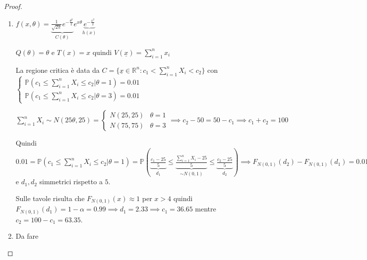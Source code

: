 \documentclass[hidelinks, 10pt]{report}
\begin{document}
\begin{proof}
\noindent
\begin{enumerate}
\item $ f(x, \theta) = \underbrace{\frac{1}{\sqrt{2\pi}} e^{- \frac{\theta^{2}}{2}}}_{C(\theta)} e^{x \theta} \underbrace{e^{-\frac{x^{2}}{2}}}_{h(x)} $

$ Q(\theta) = \theta $ e $ T(x) = x $ quindi $ V(\underline{x}) = \sum\limits_{i = 1}^{n} x_{i} $

La regione critica \`e data da $ C = \{ \underline{x} \in \mathbb{R}^{n} : c_{1} < \sum\limits_{i = 1}^{n} X_{i} < c_{2} \} $ con $ \begin{cases} 
\mathbb{P} (c_{1} \le \sum\limits_{i = 1}^{n} X_{i} \le c_{2} \vert \theta = 1) = 0.01 \\
\mathbb{P} (c_{1} \le \sum\limits_{i = 1}^{n} X_{i} \le c_{2} \vert \theta = 3) = 0.01
\end{cases} $

$ \sum\limits_{i = 1}^{n} X_{i} \sim N(25 \theta, 25) = \begin{cases}
N(25, 25) & \theta = 1 \\
N(75, 75) & \theta = 3
\end{cases} \implies c_{2} - 50 = 50 - c_{1} \implies c_{1} + c_{2} = 100 $ 

Quindi $ 0.01 = \mathbb{P} (c_{1} \le \sum\limits_{i = 1}^{n} X_{i} \le c_{2} \vert \theta = 1) = \mathbb{P} \left( \underbrace{\frac{c_{1} - 25}{5}}_{d_{1}} \le \underbrace{\frac{\sum\limits_{i = 1}^{n} X_{i} - 25}{5}}_{\sim N(0,1)} \le \underbrace{\frac{c_{2} - 25}{5}}_{d_{2}} \right) \implies F_{N(0,1)} (d_{2}) - F_{N(0,1)} (d_{1}) = 0.01 $ e $ d_{1}, d_{2} $ simmetrici rispetto a $ 5 $.

Sulle tavole risulta che $ F_{N(0,1)} (x) \approx 1 $ per $ x > 4 $ quindi $ F_{N(0,1)} (d_{1}) = 1 - \alpha = 0.99 \implies d_{1} = 2.33 \implies c_{1} = 36.65 $ mentre $ c_{2} = 100 - c_{1} = 63.35 $.
\item Da fare
\end{enumerate}
\end{proof}
\end{document}
